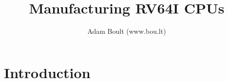\documentclass[oneside]{book}
\begin{document}
\author{Adam Boult (www.bou.lt)}
\title{Manufacturing RV64I CPUs}
\maketitle

\setcounter{tocdepth}{0}
\tableofcontents



\part{Introduction}
\end{document}
